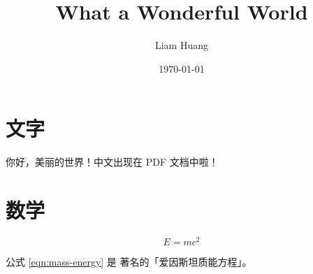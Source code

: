 \documentclass[UTF8]{ctexart}
\title{What a Wonderful World}
\author{Liam Huang}
\date{\today}
\begin{document}
\maketitle
\section{文字}
你好，美丽的世界！中文出现在 PDF 文档中啦！
\section{数学}
\begin{equation}
  E = mc^{2}\label{eqn:mass-energy}
\end{equation}

公式 \ref{eqn:mass-energy} 是
著名的「爱因斯坦质能方程」。
\end{document}
